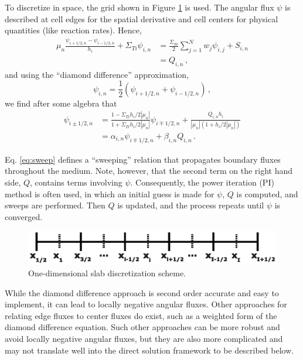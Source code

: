 \documentclass[final,3p,times,11pt]{elsarticle}
\begin{document}
  To discretize in space, the grid shown in Figure \ref{fig:slab_spatial} is used.  The angular flux $\psi$ is described at cell edges for the spatial derivative and cell centers for physical quantities (like reaction rates).  Hence,
    \begin{equation}
    \begin{split}
      \mu_n \frac{\psi_{i+1/2,n}-\psi_{i-1/2,n}} {h_i} + \Sigma_{Ti}\psi_{i,n} &= \frac{\Sigma_{Si}}{2} \sum^N_{j=1} w_j \psi_{i,j} + S_{i,n} \\
			    &= Q_{i,n} \, ,
    \end{split}
    \end{equation}
    and using the ``diamond difference'' approximation,
    \begin{equation}
      \psi_{i,n} = \frac{1}{2} ( \psi_{i+1/2,n} + \psi_{i-1/2,n} ) \, ,
    \end{equation}
    we find after some algebra that
    \begin{equation}
    \begin{split}
    \psi_{i\pm1/2,n} &= \frac{1-\Sigma_{Ti}h_i/2|\mu_n|}{1+\Sigma_{Ti}h_i/2|\mu_n|} \psi_{i\mp1/2,n} + \frac{Q_{i,n} h_i}{|\mu_n|(1+h_i/2|\mu_n|)} \\
		    &= \alpha_{i,n} \psi_{i\mp1/2,n} + \beta_{i,n} Q_{i,n} \, .
    \end{split}    
    \label{eq:sweep}
    \end{equation}
    
    Eq. \ref{eq:sweep} defines a ``sweeping'' relation that propagates boundary fluxes throughout the medium.  Note, however, that the second term on the right hand side, $Q$, contains terms involving $\psi$.  Consequently, the power iteration (PI) method is often used, in which an initial guess is made for $\psi$, $Q$ is computed, and sweeps are performed.  Then $Q$ is updated, and the process repeats until $\psi$ is converged.

   \begin{figure}[ht]  
	\centering
	\includegraphics[keepaspectratio, width = 3.5 in]{slab_spatial}
        \caption{One-dimensional slab discretization scheme.}
        \label{fig:slab_spatial}
    \end{figure}

  While the diamond difference approach is second order accurate \cite{lewis1993cmn} and easy to implement, it can lead to locally negative angular fluxes. Other approaches for relating edge fluxes to center fluxes do exist, such as a weighted form of the diamond difference equation. Such other approaches can be more robust and avoid locally negative angular fluxes, but they are also more complicated and may not translate well into the direct solution framework to be described below.
\end{document}
